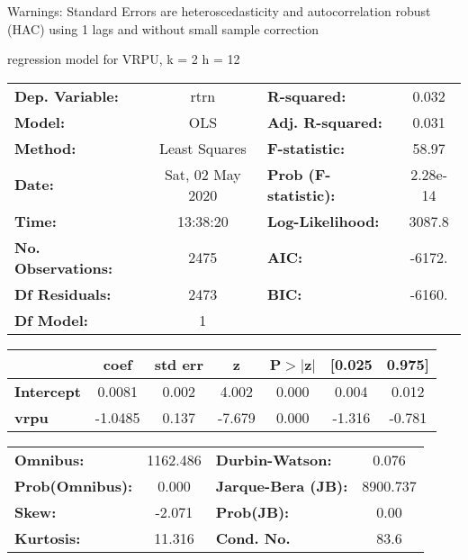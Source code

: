 Warnings: \newline
 [1] Standard Errors are heteroscedasticity and autocorrelation robust (HAC) using 1 lags and without small sample correction\ 

regression model for VRPU, k = 2 h = 12\begin{center}
\begin{tabular}{lclc}
\toprule
\textbf{Dep. Variable:}    &       rtrn       & \textbf{  R-squared:         } &     0.032   \\
\textbf{Model:}            &       OLS        & \textbf{  Adj. R-squared:    } &     0.031   \\
\textbf{Method:}           &  Least Squares   & \textbf{  F-statistic:       } &     58.97   \\
\textbf{Date:}             & Sat, 02 May 2020 & \textbf{  Prob (F-statistic):} &  2.28e-14   \\
\textbf{Time:}             &     13:38:20     & \textbf{  Log-Likelihood:    } &    3087.8   \\
\textbf{No. Observations:} &        2475      & \textbf{  AIC:               } &    -6172.   \\
\textbf{Df Residuals:}     &        2473      & \textbf{  BIC:               } &    -6160.   \\
\textbf{Df Model:}         &           1      & \textbf{                     } &             \\
\bottomrule
\end{tabular}
\begin{tabular}{lcccccc}
                   & \textbf{coef} & \textbf{std err} & \textbf{z} & \textbf{P$> |$z$|$} & \textbf{[0.025} & \textbf{0.975]}  \\
\midrule
\textbf{Intercept} &       0.0081  &        0.002     &     4.002  &         0.000        &        0.004    &        0.012     \\
\textbf{vrpu}      &      -1.0485  &        0.137     &    -7.679  &         0.000        &       -1.316    &       -0.781     \\
\bottomrule
\end{tabular}
\begin{tabular}{lclc}
\textbf{Omnibus:}       & 1162.486 & \textbf{  Durbin-Watson:     } &    0.076  \\
\textbf{Prob(Omnibus):} &   0.000  & \textbf{  Jarque-Bera (JB):  } & 8900.737  \\
\textbf{Skew:}          &  -2.071  & \textbf{  Prob(JB):          } &     0.00  \\
\textbf{Kurtosis:}      &  11.316  & \textbf{  Cond. No.          } &     83.6  \\
\bottomrule
\end{tabular}
\end{center}


